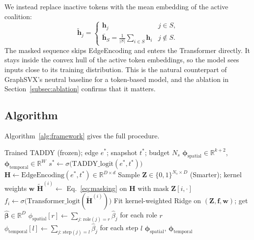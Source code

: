 \documentclass[conference]{IEEEtran}
\begin{document}
We instead replace inactive tokens with the mean embedding of the active
coalition:
\begin{equation}
\tilde{\mathbf{h}}_j=\begin{cases}
\mathbf{h}_j & j\in S,\\
\bar{\mathbf{h}}_S=\frac{1}{|S|}\sum_{i\in S}\mathbf{h}_i & j\notin S.
\end{cases}
\label{eq:masking}
\end{equation}
The masked sequence skips EdgeEncoding and enters the Transformer directly. It
stays inside the convex hull of the active token embeddings, so the model sees
inputs close to its training distribution. This is the natural counterpart of
GraphSVX's neutral baseline for a token-based model, and the ablation in
Section~\ref{subsec:ablation} confirms that it matters.

\subsection{Algorithm}
Algorithm~\ref{alg:framework} gives the full procedure.

\begin{algorithm}[t]
\caption{Dual Spatial-Temporal Shapley Attribution}
\label{alg:framework}
\begin{algorithmic}[1]
\REQUIRE Trained TADDY (frozen); edge $e^*$; snapshot $t^*$; budget $N_s$
\ENSURE $\boldsymbol{\phi}_{\mathrm{spatial}}\in\mathbb{R}^{k+2}$,
        $\boldsymbol{\phi}_{\mathrm{temporal}}\in\mathbb{R}^{W}$
\STATE $s^*\leftarrow\sigma\bigl(\mathrm{TADDY\_logit}(e^*,t^*)\bigr)$
\STATE $\mathbf{H}\leftarrow\mathrm{EdgeEncoding}(e^*,t^*)\in\mathbb{R}^{D\times d}$
\STATE Sample $\mathbf{Z}\in\{0,1\}^{N_s\times D}$ (Smarter); kernel weights $\mathbf{w}$
  \STATE $\tilde{\mathbf{H}}^{(i)}\leftarrow$ Eq.~\eqref{eq:masking} on
         $\mathbf{H}$ with mask $\mathbf{Z}[i,\cdot]$
  \STATE $f_i\leftarrow\sigma\bigl(\mathrm{Transformer\_logit}(\tilde{\mathbf{H}}^{(i)})\bigr)$
\ENDFOR
\STATE Fit kernel-weighted Ridge on $(\mathbf{Z},\mathbf{f},\mathbf{w})$;
       get $\hat{\boldsymbol{\beta}}\in\mathbb{R}^{D}$
\STATE $\phi_{\mathrm{spatial}}[r]\leftarrow\sum_{j:\,\mathrm{role}(j)=r}\hat{\beta}_j$ for each role $r$
\STATE $\phi_{\mathrm{temporal}}[l]\leftarrow\sum_{j:\,\mathrm{step}(j)=l}\hat{\beta}_j$ for each step $l$
\RETURN $\boldsymbol{\phi}_{\mathrm{spatial}},\,\boldsymbol{\phi}_{\mathrm{temporal}}$
\end{algorithmic}
\end{algorithm}
\end{document}
